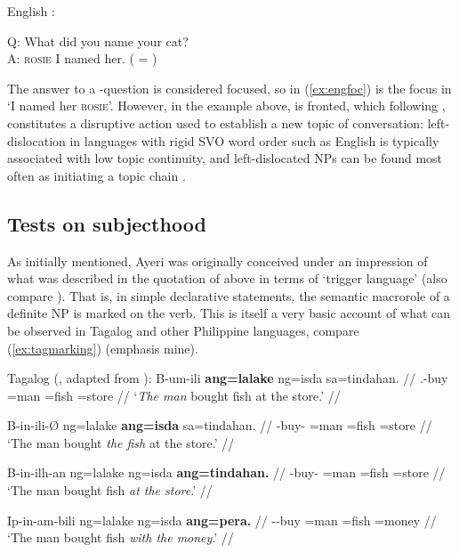 \ex\label{ex:engfoc}%
English \parencite[98]{bresnan2016}:\medskip

Q: What did you name your cat?\\
A: \textsc{rosie} I named her. ( = \Foc{})
\xe

The answer to a -question is considered focused, so  in
(\ref{ex:engfoc}) is the focus in `I named her \textsc{rosie}'. However, in the
example above,  is fronted, which following \citet{givon1983},
constitutes a disruptive action used to establish a new topic of conversation:
left-dislocation in languages with rigid SVO word order such as English is
typically associated with low topic continuity, and left-dislocated NPs can be
found most often as initiating a topic chain \citep[32]{givon1983}.

\subsection{Tests on subjecthood}

As initially mentioned, Ayeri was originally conceived under an impression of
what was described in the quotation of \citet{cowan1995} above in terms of
`trigger language' (also compare \cite{schachter2015}). That is, in simple
declarative statements, the semantic macrorole of a definite NP is marked on
the verb. This is itself a very basic account of what can be observed in
Tagalog and other Philippine languages, compare (\ref{ex:tagmarking}) (emphasis
mine).

\pex\label{ex:tagmarking}%
Tagalog (\cite[14]{kroeger1991}, adapted from \cite[135]{foleyvanvalin1984}):
\a\label{ex:tagmarking_av}\begingl
	\gla B-um-ili \textbf{ang=lalake} ng=isda sa=tindahan. //
	\glb \Pfv{}.\Av{}-buy \Nom{}=man \Gen{}=fish \Dat{}=store //
	\glft `\emph{The man} bought fish at the store.' //
\endgl

\a\label{ex:tagmarking_ov}\begingl
	\gla B-in-ili-Ø ng=lalake \textbf{ang=isda} sa=tindahan. //
	\glb \Pfv{}-buy-\Ov{} \Gen{}=man \Nom{}=fish \Dat{}=store //
	\glft `The man bought \emph{the fish} at the store.' //
\endgl

\a\label{ex:tagmarking_dv}\begingl
	\gla B-in-ilh-an ng=lalake ng=isda \textbf{ang=tindahan.} //
	\glb \Pfv{}-buy-\Dv{} \Gen{}=man \Gen{}=fish \Nom{}=store //
	\glft `The man bought fish \emph{at the store}.' //
\endgl

\a\label{ex:tagmarking_iv}\begingl
	\gla Ip-in-am-bili ng=lalake ng=isda \textbf{ang=pera.} //
	\glb \Iv{}-\Pfv{}-buy \Gen{}=man \Gen{}=fish \Nom{}=money //
	\glft `The man bought fish \emph{with the money}.' //
\endgl

